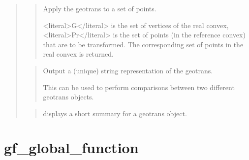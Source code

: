 \documentclass[a4paper,11pt,english]{sphinxmanual}
\begin{document}
\begin{quote}
\begin{quote}
\sphinxAtStartPar
Apply the geotrans to a set of points.

\sphinxAtStartPar
\textless{}literal\textgreater{}G\textless{}/literal\textgreater{} is the set of vertices of the real convex, \textless{}literal\textgreater{}Pr\textless{}/literal\textgreater{} is the set
of points (in the reference convex) that are to be transformed.
The corresponding set of points in the real convex is returned.
\end{quote}

\sphinxAtStartPar
{}
\begin{quote}

\sphinxAtStartPar
Output a (unique) string representation of the geotrans.

\sphinxAtStartPar
This can be used to perform comparisons between two
different geotrans objects.
\end{quote}

\sphinxAtStartPar
{}
\begin{quote}

\sphinxAtStartPar
displays a short summary for a geotrans object.
\end{quote}
\end{quote}


\section{gf\_global\_function}
\label{\detokenize{scilab/cmdref_gf_global_function:gf-global-function}}\label{\detokenize{scilab/cmdref_gf_global_function::doc}}
\sphinxAtStartPar
{}
\end{document}
